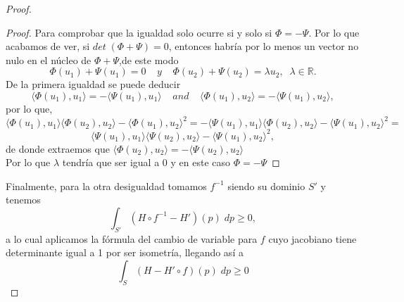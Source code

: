\begin{proof}
\begin{proof}
		Para comprobar que la igualdad solo ocurre si y solo si $\Phi = -\Psi$. Por lo que acabamos de ver, si $det \; (\Phi + \Psi) = 0$, entonces habría por lo menos un vector no nulo en el núcleo de $\Phi + \Psi$,de este modo
		${ }$\\
		\[
			\Phi(u_1) + \Psi(u_1) = 0 \;\;\;\; y \;\;\;\; \Phi(u_2) + \Psi(u_2) = \lambda u_2, \;\; \lambda \in \mathbb{R}.
		\]
		${ }$\\
		
		De la primera igualdad se puede deducir
		${ }$\\
		$$ \langle \Phi(u_1), u_1 \rangle = - \langle \Psi(u_1), u_1 \rangle \;\;\;\; and \;\;\;\; \langle \Phi(u_1), u_2 \rangle = - \langle \Psi(u_1), u_2 \rangle, $$
		${ }$\\
		por lo que,
		${ }$\\
		$$ \langle \Phi(u_1),u_1\rangle \langle \Phi(u_2),u_2\rangle - \langle \Phi(u_1),u_2\rangle^2 =  -\langle \Psi(u_1),u_1\rangle \langle \Phi(u_2),u_2\rangle - \langle \Psi(u_1),u_2\rangle^2 = $$ $$ \langle \Psi(u_1),u_1\rangle \langle \Psi(u_2),u_2\rangle -\langle \Psi(u_1),u_2\rangle^2, $$
		${ }$\\
		de donde extraemos que $ \langle \Phi(u_2),u_2\rangle = -\langle \Psi(u_2),u_2\rangle $
		${ }$\\
		
		Por lo que $\lambda$ tendría que ser igual a $0$ y en este caso $\Phi = -\Psi$
		
	\end{proof}
	
	Finalmente, para la otra desigualdad tomamos $f^{-1}$ siendo su dominio $S'$ y tenemos
	${ }$\\
	\[
		\int_{S'} (H \circ f^{-1} - H')(p) \; dp \geq 0,
	\]
	${ }$\\
	a lo cual aplicamos la fórmula del cambio de variable para $f$ cuyo jacobiano tiene determinante igual a 1 por ser isometría, llegando así a
	${ }$\\
	\[
		\int_S (H - H' \circ f) (p) \; dp \geq 0
	\]
\end{proof}
${ }$\\



